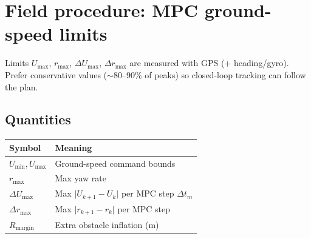 \documentclass[11pt,a4paper]{article}
\begin{document}
\section{Field procedure: MPC ground-speed limits}
\label{sec:limits}

Limits \(U_{\max}\), \(r_{\max}\), \(\Delta U_{\max}\), \(\Delta r_{\max}\) are
measured with GPS (+ heading/gyro). Prefer conservative values
(\(\sim 80\)--\(90\%\) of peaks) so closed-loop tracking can follow the plan.

\subsection{Quantities}
\begin{center}
\small
\begin{tabular}{@{}ll@{}}
\toprule
Symbol & Meaning \\
\midrule
$U_{\min},U_{\max}$ & Ground-speed command bounds \\
$r_{\max}$ & Max yaw rate \\
$\Delta U_{\max}$ & Max \(\lvert U_{k+1}-U_k\rvert\) per MPC step \(\Delta t_m\) \\
$\Delta r_{\max}$ & Max \(\lvert r_{k+1}-r_k\rvert\) per MPC step \\
$R_{\mathrm{margin}}$ & Extra obstacle inflation (m) \\
\bottomrule
\end{tabular}
\end{center}
\end{document}

